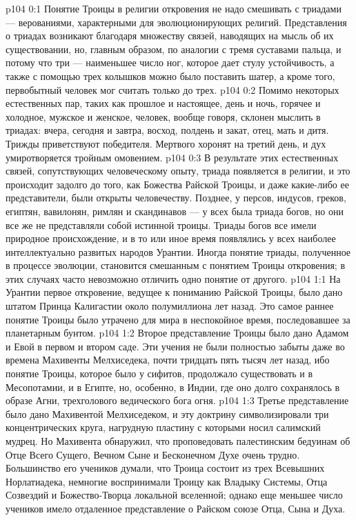 \author{Мелхиседек}
\vs p104 0:1 Понятие Троицы в религии откровения не надо смешивать с триадами --- верованиями, характерными для эволюционирующих религий. Представления о триадах возникают благодаря множеству связей, наводящих на мысль об их существовании, но, главным образом, по аналогии с тремя суставами пальца, и потому что три --- наименьшее число ног, которое дает стулу устойчивость, а также с помощью трех колышков можно было поставить шатер, а кроме того, первобытный человек мог считать только до трех.
\vs p104 0:2 Помимо некоторых естественных пар, таких как прошлое и настоящее, день и ночь, горячее и холодное, мужское и женское, человек, вообще говоря, склонен мыслить в триадах: вчера, сегодня и завтра, восход, полдень и закат, отец, мать и дитя. Трижды приветствуют победителя. Мертвого хоронят на третий день, и дух умиротворяется тройным омовением.
\vs p104 0:3 В результате этих естественных связей, сопутствующих человеческому опыту, триада появляется в религии, и это происходит задолго до того, как Божества Райской Троицы, и даже какие\hyp{}либо ее представители, были открыты человечеству. Позднее, у персов, индусов, греков, египтян, вавилонян, римлян и скандинавов --- у всех была триада богов, но они все же не представляли собой истинной троицы. Триады богов все имели природное происхождение, и в то или иное время появлялись у всех наиболее интеллектуально развитых народов Урантии. Иногда понятие триады, полученное в процессе эволюции, становится смешанным с понятием Троицы откровения; в этих случаях часто невозможно отличить одно понятие от другого.
\vs p104 1:1 На Урантии первое откровение, ведущее к пониманию Райской Троицы, было дано штатом Принца Калигастии около полумиллиона лет назад. Это самое раннее понятие Троицы было утрачено для мира в неспокойное время, последовавшее за планетарным бунтом.
\vs p104 1:2 Второе представление Троицы было дано Адамом и Евой в первом и втором саде. Эти учения не были полностью забыты даже во времена Махивенты Мелхиседека, почти тридцать пять тысяч лет назад, ибо понятие Троицы, которое было у сифитов, продолжало существовать и в Месопотамии, и в Египте, но, особенно, в Индии, где оно долго сохранялось в образе Агни, трехголового ведического бога огня.
\vs p104 1:3 Третье представление было дано Махивентой Мелхиседеком, и эту доктрину символизировали три концентрических круга, нагрудную пластину с которыми носил салимский мудрец. Но Махивента обнаружил, что проповедовать палестинским бедуинам об Отце Всего Сущего, Вечном Сыне и Бесконечном Духе очень трудно. Большинство его учеников думали, что Троица состоит из трех Всевышних Норлатиадека, немногие воспринимали Троицу как Владыку Системы, Отца Созвездий и Божество\hyp{}Творца локальной вселенной; однако еще меньшее число учеников имело отдаленное представление о Райском союзе Отца, Сына и Духа.
